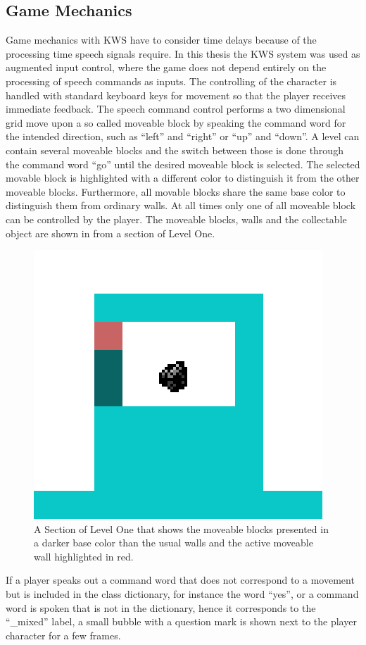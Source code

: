 \subsection{Game Mechanics}\label{sec:game_design_mechanics}
Game mechanics with KWS have to consider time delays because of the processing time speech signals require.
In this thesis the KWS system was used as augmented input control, where the game does not depend entirely on the processing of speech commands as inputs.
The controlling of the character is handled with standard keyboard keys for movement so that the player receives immediate feedback. 
The speech command control performs a two dimensional grid move upon a so called moveable block by speaking the command word for the intended direction, such as \enquote{left} and \enquote{right} or \enquote{up} and \enquote{down}.
A level can contain several moveable blocks and the switch between those is done through the command word \enquote{go} until the desired moveable block is selected.
The selected movable block is highlighted with a different color to distinguish it from the other moveable blocks.
Furthermore, all movable blocks share the same base color to distinguish them from ordinary walls.
At all times only one of all moveable block can be controlled by the player.
The moveable blocks, walls and the collectable object are shown in  from a section of Level One.
\begin{figure}[!ht]
  \centering
  \includegraphics[height=0.25\textwidth]{./6_game/figs/game_design_mechanic_thing.png}
  \caption{A Section of Level One that shows the moveable blocks presented in a darker base color than the usual walls and the active moveable wall highlighted in red.}
  \label{fig:game_design_mechanic_thing}
\end{figure}
\FloatBarrier
\noindent
If a player speaks out a command word that does not correspond to a movement but is included in the class dictionary, for instance the word \enquote{yes}, or a command word is spoken that is not in the dictionary, hence it corresponds to the \enquote{\_mixed} label, a small bubble with a question mark is shown next to the player character for a few frames.
